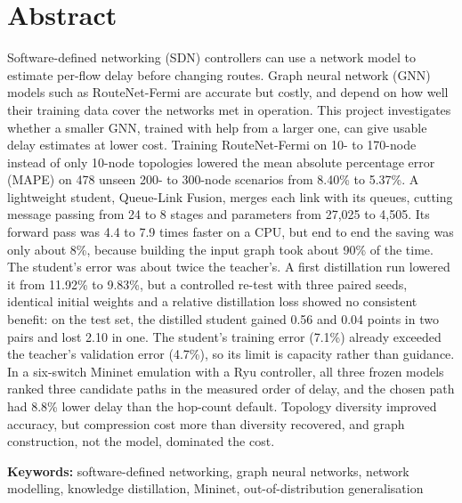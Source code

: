 \chapter*{Abstract}

Software-defined networking (SDN) controllers can use a network model to estimate per-flow delay before changing routes. Graph neural network (GNN) models such as RouteNet-Fermi are accurate but costly, and depend on how well their training data cover the networks met in operation. This project investigates whether a smaller GNN, trained with help from a larger one, can give usable delay estimates at lower cost. Training RouteNet-Fermi on 10- to 170-node instead of only 10-node topologies lowered the mean absolute percentage error (MAPE) on 478 unseen 200- to 300-node scenarios from 8.40\% to 5.37\%. A lightweight student, Queue-Link Fusion, merges each link with its queues, cutting message passing from 24 to 8 stages and parameters from 27,025 to 4,505. Its forward pass was 4.4 to 7.9 times faster on a CPU, but end to end the saving was only about 8\%, because building the input graph took about 90\% of the time. The student's error was about twice the teacher's. A first distillation run lowered it from 11.92\% to 9.83\%, but a controlled re-test with three paired seeds, identical initial weights and a relative distillation loss showed no consistent benefit: on the test set, the distilled student gained 0.56 and 0.04 points in two pairs and lost 2.10 in one. The student's training error (7.1\%) already exceeded the teacher's validation error (4.7\%), so its limit is capacity rather than guidance. In a six-switch Mininet emulation with a Ryu controller, all three frozen models ranked three candidate paths in the measured order of delay, and the chosen path had 8.8\% lower delay than the hop-count default. Topology diversity improved accuracy, but compression cost more than diversity recovered, and graph construction, not the model, dominated the cost.

\vspace{4mm}
\noindent\textbf{Keywords:} software-defined networking, graph neural networks, network modelling, knowledge distillation, Mininet, out-of-distribution generalisation
